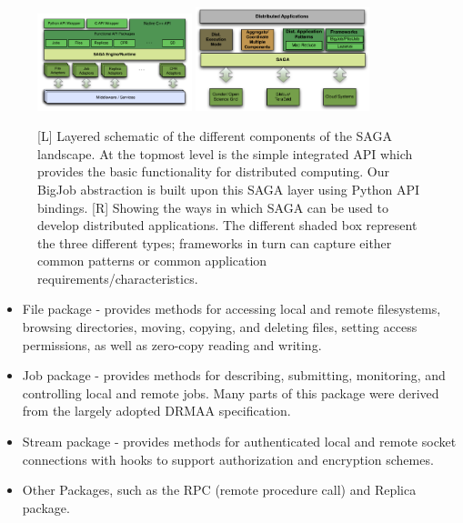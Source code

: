 \documentclass{rspublic}
\begin{document}
\begin{figure}[!ht]
 \begin{center}
     \includegraphics[width=0.40\textwidth]{stci_saga_figures-1.pdf}
    \includegraphics[width=0.45\textwidth]{distributed_applications_saga_figure.pdf}
\end{center}
\caption{\small [L] Layered schematic of the different components of
  the SAGA landscape. At the topmost level is the simple integrated
  API which provides the basic functionality for distributed
  computing. Our BigJob abstraction is built upon this SAGA layer
  using Python API bindings. [R] Showing the ways in which SAGA can be
  used to develop distributed applications.  The different shaded box
  represent the three different types; frameworks in turn can capture
  either common patterns or common application
  requirements/characteristics.} \label{Fig:SAGA1}
\end{figure}

\begin{itemize}
\item File package - provides methods for accessing local and remote
 filesystems, browsing directories, moving, copying, and deleting
 files, setting access permissions, as well as zero-copy reading and
 writing.
\item Job package - provides methods for describing, submitting,
 monitoring, and controlling local and remote jobs. Many parts of
 this package were derived from the largely adopted
 DRMAA %
 specification.
\item Stream package - provides methods for authenticated local and
 remote socket connections with hooks to support authorization and
 encryption schemes.
\item Other Packages, such as the RPC (remote procedure call) and Replica
 package.
\end{itemize}
\end{document}
